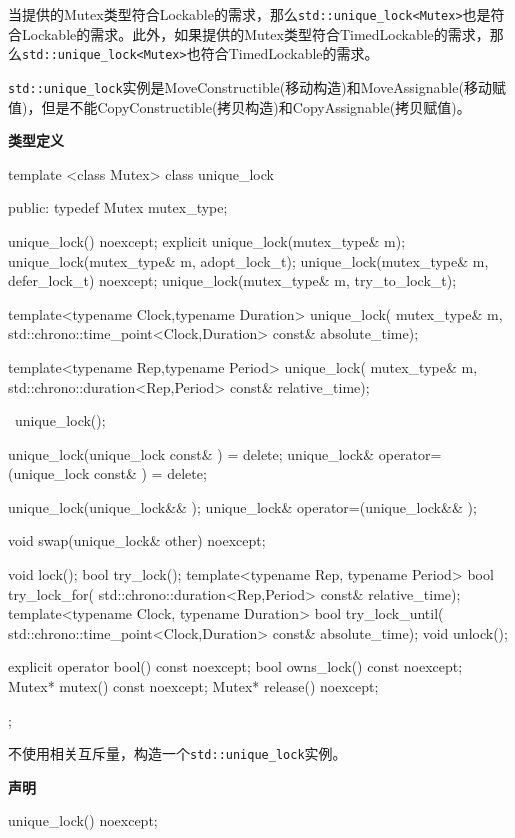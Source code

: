当提供的Mutex类型符合Lockable的需求，那么\texttt{std::unique\_lock<Mutex>}也是符合Lockable的需求。此外，如果提供的Mutex类型符合TimedLockable的需求，那么\texttt{std::unique\_lock<Mutex>}也符合TimedLockable的需求。

\texttt{std::unique\_lock}实例是MoveConstructible(移动构造)和MoveAssignable(移动赋值)，但是不能CopyConstructible(拷贝构造)和CopyAssignable(拷贝赋值)。

\textbf{类型定义}

\begin{cpp}
template <class Mutex>
class unique_lock
{
public:
  typedef Mutex mutex_type;

  unique_lock() noexcept;
  explicit unique_lock(mutex_type& m);
  unique_lock(mutex_type& m, adopt_lock_t);
  unique_lock(mutex_type& m, defer_lock_t) noexcept;
  unique_lock(mutex_type& m, try_to_lock_t);

  template<typename Clock,typename Duration>
  unique_lock(
      mutex_type& m,
      std::chrono::time_point<Clock,Duration> const& absolute_time);

  template<typename Rep,typename Period>
      unique_lock(
      mutex_type& m,
      std::chrono::duration<Rep,Period> const& relative_time);

  ~unique_lock();

  unique_lock(unique_lock const& ) = delete;
  unique_lock& operator=(unique_lock const& ) = delete;

  unique_lock(unique_lock&& );
  unique_lock& operator=(unique_lock&& );

  void swap(unique_lock& other) noexcept;

  void lock();
  bool try_lock();
  template<typename Rep, typename Period>
  bool try_lock_for(
      std::chrono::duration<Rep,Period> const& relative_time);
  template<typename Clock, typename Duration>
  bool try_lock_until(
      std::chrono::time_point<Clock,Duration> const& absolute_time);
  void unlock();

  explicit operator bool() const noexcept;
  bool owns_lock() const noexcept;
  Mutex* mutex() const noexcept;
  Mutex* release() noexcept;
};
\end{cpp}


不使用相关互斥量，构造一个\texttt{std::unique\_lock}实例。

\textbf{声明}

\begin{cpp}
unique_lock() noexcept;
\end{cpp}

